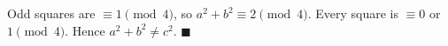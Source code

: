 Odd squares are $\equiv1\pmod4$, so $a^2+b^2\equiv2\pmod4$. Every square is $\equiv0$ or $1\pmod4$. Hence $a^2+b^2\ne c^2$. $\blacksquare$
